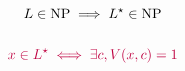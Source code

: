 \begin{frame}
  \[
	L \in \text{NP} \implies L^{\star} \in \text{NP}
  \]

  \pause
  \begin{columns}
	  
  \end{columns}

  \pause
  \vspace{0.60cm}
  \[
	\textcolor{purple}{x \in L^{\star} \iff \exists c, V(x,c) = 1}
  \]
\end{frame}
